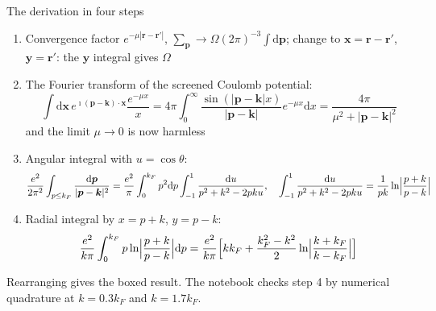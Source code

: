 \documentclass[aspectratio=169,10pt]{beamer}
\newcommand{\dd}{\mathrm{d}}
\begin{document}
\begin{frame}{The derivation in four steps}
  \small
  \begin{enumerate}
    \item Convergence factor $e^{-\mu|\bm r-\bm r'|}$, $\sum_{\bm p}\to\Omega(2\pi)^{-3}\int\dd\bm p$; change to $\bm x=\bm r-\bm r'$, $\bm y=\bm r'$: the $\bm y$ integral gives $\Omega$
    \item The Fourier transform of the screened Coulomb potential:
      \[
        \int\dd\bm x\,e^{\imath(\bm p-\bm k)\cdot\bm x}\frac{e^{-\mu x}}{x}=4\pi\int_0^\infty\frac{\sin(|\bm p-\bm k|x)}{|\bm p-\bm k|}e^{-\mu x}\dd x=\frac{4\pi}{\mu^2+|\bm p-\bm k|^2}
      \]
      and the limit $\mu\to0$ is now harmless
    \item Angular integral with $u=\cos\theta$:
      \[
        \frac{e^2}{2\pi^2}\int_{p\le k_F}\frac{\dd\bm p}{|\bm p-\bm k|^2}=\frac{e^2}{\pi}\int_0^{k_F}p^2\dd p\int_{-1}^{1}\frac{\dd u}{p^2+k^2-2pku},
        \quad
        \int_{-1}^{1}\frac{\dd u}{p^2+k^2-2pku}=\frac{1}{pk}\ln\Bigl|\frac{p+k}{p-k}\Bigr|
      \]
    \item Radial integral by $x=p+k$, $y=p-k$:
      \[
        \frac{e^2}{k\pi}\int_0^{k_F}p\ln\Bigl|\frac{p+k}{p-k}\Bigr|\dd p=\frac{e^2}{k\pi}\Bigl[kk_F+\frac{k_F^2-k^2}{2}\ln\Bigl|\frac{k+k_F}{k-k_F}\Bigr|\Bigr]
      \]
  \end{enumerate}
  \centering\small Rearranging gives the boxed result. The notebook checks step 4 by numerical quadrature at $k=0.3k_F$ and $k=1.7k_F$.
\end{frame}
\end{document}

